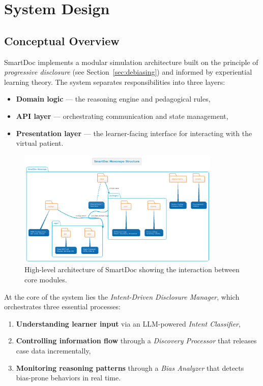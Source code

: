 \section{System Design} \label{sec:system_design}

\subsection{Conceptual Overview}

SmartDoc implements a modular simulation architecture built on the principle of \textit{progressive disclosure} (see Section~\ref{sec:debiasing}) and informed by experiential learning theory. The system separates responsibilities into three layers:
\begin{itemize}
    \item \textbf{Domain logic} — the reasoning engine and pedagogical rules,
    \item \textbf{API layer} — orchestrating communication and state management,
    \item \textbf{Presentation layer} — the learner-facing interface for interacting with the virtual patient.
\end{itemize}

\begin{figure}[h]
    \centering
    \includegraphics[width=0.86\textwidth]{figures/diagrams/high-level.png}
    \caption{High-level architecture of SmartDoc showing the interaction between core modules.}
    \label{fig:arch}
\end{figure}

At the core of the system lies the \textit{Intent-Driven Disclosure Manager}, which orchestrates three essential processes:
\begin{enumerate}
    \item \textbf{Understanding learner input} via an LLM-powered \emph{Intent Classifier},
    \item \textbf{Controlling information flow} through a \emph{Discovery Processor} that releases case data incrementally,
    \item \textbf{Monitoring reasoning patterns} through a \emph{Bias Analyzer} that detects bias-prone behaviors in real time.
\end{enumerate}

